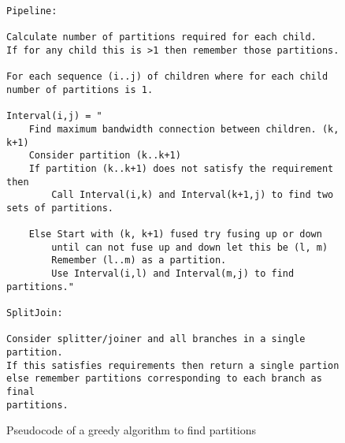 \begin{figure*}[t]
\begin{verbatim}
Pipeline:

Calculate number of partitions required for each child.
If for any child this is >1 then remember those partitions.

For each sequence (i..j) of children where for each child 
number of partitions is 1.

Interval(i,j) = "
    Find maximum bandwidth connection between children. (k, k+1)
    Consider partition (k..k+1) 
    If partition (k..k+1) does not satisfy the requirement then
        Call Interval(i,k) and Interval(k+1,j) to find two sets of partitions.

    Else Start with (k, k+1) fused try fusing up or down
        until can not fuse up and down let this be (l, m)
        Remember (l..m) as a partition.
        Use Interval(i,l) and Interval(m,j) to find partitions."

SplitJoin:

Consider splitter/joiner and all branches in a single partition.
If this satisfies requirements then return a single partion
else remember partitions corresponding to each branch as final
partitions.
\end{verbatim}
\caption{Pseudocode of a greedy algorithm to find partitions}
\label{fig:greedy}
\end{figure*}
